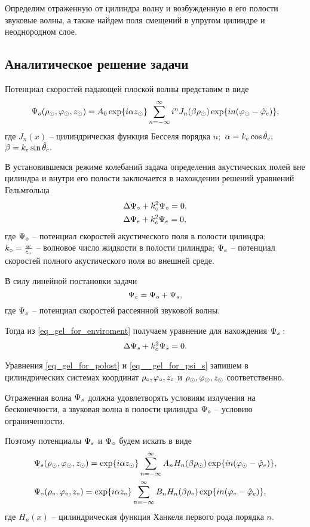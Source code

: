 Определим отраженную от цилиндра волну и возбужденную в его полости звуковые волны, а также найдем поля смещений в упругом цилиндре и неоднородном слое.

\newpage
\subsection{Аналитическое решение задачи}

Потенциал скоростей падающей плоской волны представим в виде
$$\P\o(\r\cyl, \f\cyl, z\cyl)=A_0\exp\{i\alpha  z\cyl\}\sum_{n=-\infty}^{\infty}i^nJ_n(\beta  \r\cyl)\exp\{in(\f\cyl-\hat\f\en)\},$$
где $J_n(x)$ -- цилиндрическая функция Бесселя порядка $n;$ $\alpha=k\en\cos\hat\theta\en;$ \\$\beta=k\en\sin\hat\theta\en.$

В установившемся режиме колебаний задача определения акустических полей вне цилиндра и внутри его полости заключается в нахождении решений уравнений Гельмгольца
\begin{align}
&\Lap\P\c+k\c^2\P\c=0\label{eq_gel_for_polost},\\
&\Lap\P\en+k\en^2\P\en=0\label{eq_gel_for_enviroment},
\end{align}
где $\P\c$ -- потенциал скоростей акустического поля в полости цилиндра;\\ $k\c=\frac{\omega}{c\c}$ -- волновое число жидкости в полости цилиндра;
$\P\en$ -- потенциал скоростей полного акустического поля во внешней среде. 

В силу линейной постановки задачи
\begin{equation}
\P\en=\P\o+\P_s,
\end{equation}
где $\P_s$ -- потенциал скоростей рассеянной звуковой волны.

Тогда из \eqref{eq_gel_for_enviroment} получаем уравнение для нахождения $\P_s:$
\begin{equation}\label{eq__gel_for_psi_s}
\Lap\P_s+k\en^2\P_s=0.
\end{equation}

Уравнения \eqref{eq_gel_for_polost} и \eqref{eq__gel_for_psi_s} запишем в цилиндрических системах координат $\r\c, \f\c, z\c$ и $\r\cyl, \f\cyl, z\cyl$ соответственно. 

Отраженная волна $\P_s$ должна удовлетворять условиям излучения на бесконечности, а звуковая волна в полости цилиндра $\P\c$ -- условию ограниченности.

Поэтому потенциалы $\P_s$ и $\P\c$ будем искать в виде
\begin{align}
&\P_s(\r\cyl, \f\cyl, z\cyl)= \exp\{i\alpha z\cyl\}\sum_{n=-\infty}^{\infty}A_nH_n(\beta \r\cyl)\exp\{in(\f\cyl-\hat\f\en)\},\label{razloj_psi_s}\\
&\P\c(\r\c, \f\c, z\c)= \exp\{i\alpha z\c\}\sum_{n=-\infty}^{\infty}B_nH_n(\beta \r\c)\exp\{in(\f\c-\hat\f\en)\},\label{razloj_psi_o}
\end{align}
где $H_n(x)$ -- цилиндрическая функция Ханкеля первого рода порядка $n.$

